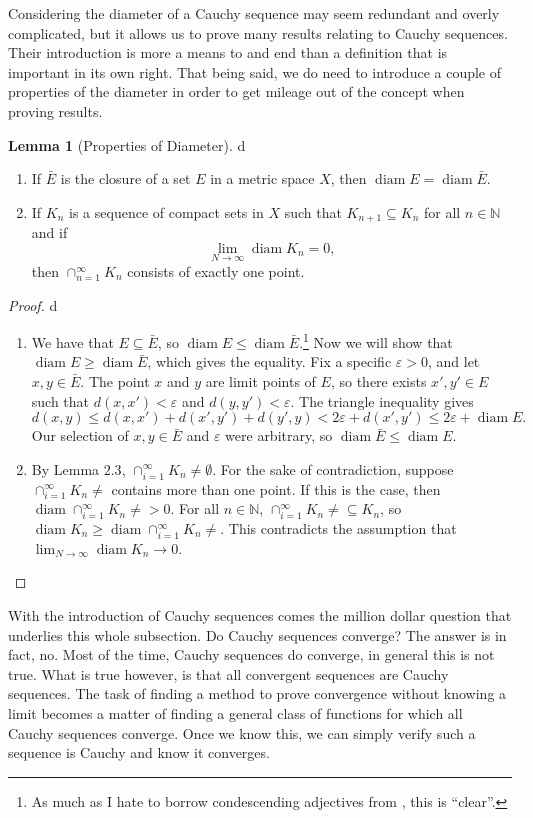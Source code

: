 \documentclass{article}
\newcommand{\N}{\mathbb{N}}
\DeclareMathOperator{\diam}{diam}
\theoremstyle{definition}
\newtheorem{lemma}{Lemma}[section]
\begin{document}
Considering the diameter of a Cauchy sequence may seem redundant and overly complicated, but it allows us to prove many results relating to Cauchy sequences. Their introduction is more a means to and end than a definition that is important in its own right. That being said, we do need to introduce a couple of properties of the diameter in order to get mileage out of the concept when proving results.
\begin{lemma}[Properties of Diameter]
	{\color{white}d}
	\begin{enumerate}
		\item If $ \bar{E} $ is the closure of a set $ E $ in a metric space $ X $, then $\diam E=\diam \bar{E} $.
		\item If $ K_n $ is a sequence of compact sets in $ X $ such that $ K_{n+1}\subseteq K_n $ for all $ n\in\N $ and if $$\lim_{N\to\infty}\diam K_n=0, $$ then $ \cap_{n=1}^\infty K_n $ consists of exactly one point. 
	\end{enumerate}
\end{lemma}
\begin{proof}	{\color{white}d}
	\begin{enumerate}
		\item We have that $ E\subseteq \bar{E} $, so $ \diam E\le \diam \bar{E} $.\footnote{As much as I hate to borrow condescending adjectives from \cite{rudin1964principles}, this is ``clear''.} Now we will show that $ \diam E\ge\diam\bar{E} $, which gives the equality. Fix a specific $ \varepsilon>0 $, and let $ x,y\in\bar{E} $. The point $ x $ and $y$ are limit points of $ E $, so there exists $ x',y'\in E $ such that $ d(x,x')<\varepsilon $ and $ d(y,y')<\varepsilon $. The triangle inequality gives $$ d(x,y)\le d(x,x')+d(x',y')+d(y',y)<2\varepsilon+d(x',y')\le 2\varepsilon+\diam E.$$ Our selection of $ x,y\in\bar{E} $ and $ \varepsilon $ were arbitrary, so $ \diam\bar{E}\le \diam E $. 
		\item By Lemma $ 2.3 $, $ \cap_{i=1}^\infty K_n\neq\emptyset $. For the sake of contradiction, suppose $ \cap_{i=1}^\infty K_n\neq $ contains more than one point. If this is the case, then $ \diam \cap_{i=1}^\infty K_n\neq>0 $. For all $n\in\N $, $ \cap_{i=1}^\infty K_n\neq\subseteq K_n $, so $ \diam K_n\ge\diam \cap_{i=1}^\infty K_n\neq $. This contradicts the assumption that $ \lim_{N\to\infty}\diam K_n\to 0 $. 
	\end{enumerate}
\end{proof}
With the introduction of Cauchy sequences comes the million dollar question that underlies this whole subsection. Do Cauchy sequences converge? The answer is in fact, no. Most of the time, Cauchy sequences do converge, in general this is not true. What is true however, is that all convergent sequences are Cauchy sequences. The task of finding a method to prove convergence without knowing a limit becomes a matter of finding a general class of functions for which all Cauchy sequences converge. Once we know this, we can simply verify such a sequence is Cauchy and know it converges. 
\end{document}
